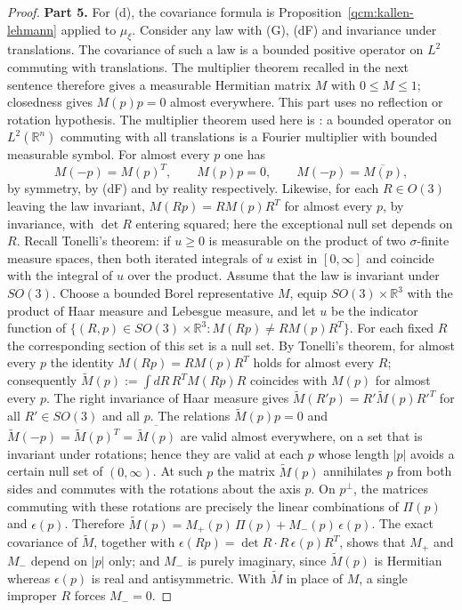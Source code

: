\documentclass[11pt,letterpaper,reqno]{amsart}
\theoremstyle{definition}
\begin{document}
\begin{proof}
\textbf{Part 5.}
For (d), the covariance formula is Proposition~\ref{qcm:kallen-lehmann} applied to $\mu_\xi$.
Consider any law with (G), (dF) and invariance under translations.
The covariance of such a law is a bounded positive operator on $L^2$ commuting with translations. The multiplier theorem recalled in the next sentence therefore gives a measurable Hermitian matrix $M$ with $0\le M\le1$; closedness gives $M(p)p=0$ almost everywhere. This part uses no reflection or rotation hypothesis.
The multiplier theorem used here is \cite[Chapter~I, Theorem~3.18]{SteinWeiss1971}: a bounded operator on $L^2(\mathbb R^n)$ commuting with all translations is a Fourier multiplier with bounded measurable symbol.
For almost every $p$ one has
\begin{equation*}
M(-p)=M(p)^T,\qquad M(p)p=0,\qquad M(-p)=\overline{M(p)},
\end{equation*}
by symmetry, by (dF) and by reality respectively.
Likewise, for each $R\in O(3)$ leaving the law invariant, $M(Rp)=RM(p)R^T$ for almost every $p$, by invariance, with $\det R$ entering squared; here the exceptional null set depends on $R$.
Recall Tonelli's theorem: if $u\ge0$ is measurable on the product of two $\sigma$-finite measure spaces, then both iterated integrals of $u$ exist in $[0,\infty]$ and coincide with the integral of $u$ over the product.
Assume that the law is invariant under $SO(3)$.
Choose a bounded Borel representative $M$, equip $SO(3)\times\mathbb R^3$ with the product of Haar measure and Lebesgue measure, and let $u$ be the indicator function of $\{(R,p)\in SO(3)\times\mathbb R^3:M(Rp)\ne RM(p)R^T\}$.
For each fixed $R$ the corresponding section of this set is a null set.
By Tonelli's theorem, for almost every $p$ the identity $M(Rp)=RM(p)R^T$ holds for almost every $R$; consequently $\tilde M(p):=\int dR\,R^TM(Rp)R$ coincides with $M(p)$ for almost every $p$.
The right invariance of Haar measure gives $\tilde M(R'p)=R'\tilde M(p)R'^T$ for all $R'\in SO(3)$ and all $p$.
The relations $\tilde M(p)p=0$ and $\tilde M(-p)=\tilde M(p)^T=\overline{\tilde M(p)}$ are valid almost everywhere, on a set that is invariant under rotations; hence they are valid at each $p$ whose length $|p|$ avoids a certain null set of $(0,\infty)$.
At such $p$ the matrix $\tilde M(p)$ annihilates $p$ from both sides and commutes with the rotations about the axis $p$.
On $p^\perp$, the matrices commuting with these rotations are precisely the linear combinations of $\Pi(p)$ and $\epsilon(p)$.
Therefore $\tilde M(p)=M_+(p)\,\Pi(p)+M_-(p)\,\epsilon(p)$.
The exact covariance of $\tilde M$, together with $\epsilon(Rp)=\det R\cdot R\,\epsilon(p)R^T$, shows that $M_+$ and $M_-$ depend on $|p|$ only; and $M_-$ is purely imaginary, since $\tilde M(p)$ is Hermitian whereas $\epsilon(p)$ is real and antisymmetric.
With $\tilde M$ in place of $M$, a single improper $R$ forces $M_-=0$.


\end{proof}
\end{document}
